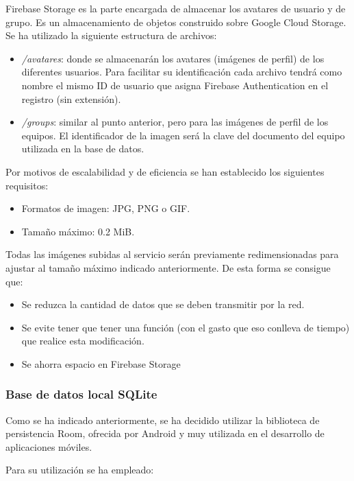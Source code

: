 \documentclass[twoside]{report}
\begin{document}
Firebase Storage es la parte encargada de almacenar los avatares de usuario y de grupo. Es un almacenamiento de objetos construido sobre Google Cloud Storage. \\

Se ha utilizado la siguiente estructura de archivos:
\begin{itemize}
\item \textit{/avatares}: donde se almacenarán los avatares (imágenes de perfil) de los diferentes usuarios. Para facilitar su identificación cada archivo tendrá como nombre el mismo ID de usuario que asigna Firebase Authentication en el registro (sin extensión). 
\item \textit{/groups}: similar al punto anterior, pero para las imágenes de perfil de los equipos. El identificador de la imagen será la clave del documento del equipo utilizada en la base de datos.
\end{itemize}

Por motivos de escalabilidad y de eficiencia se han establecido los siguientes requisitos:
\begin{itemize}
\item Formatos de imagen: JPG, PNG o GIF.
\item Tamaño máximo: 0.2 MiB.
\end{itemize}

Todas las imágenes subidas al servicio serán previamente redimensionadas para ajustar al tamaño máximo indicado anteriormente. De esta forma se consigue que:

\begin{itemize}
\item Se reduzca la cantidad de datos que se deben transmitir por la red.
\item Se evite tener que tener una función (con el gasto que eso conlleva de tiempo) que realice esta modificación.
\item Se ahorra espacio en Firebase Storage
\end{itemize}

\subsubsection{Base de datos local SQLite}

Como se ha indicado anteriormente, se ha decidido utilizar la biblioteca de persistencia Room, ofrecida por Android y muy utilizada en el desarrollo de aplicaciones móviles.

Para su utilización se ha empleado:
\end{document}
